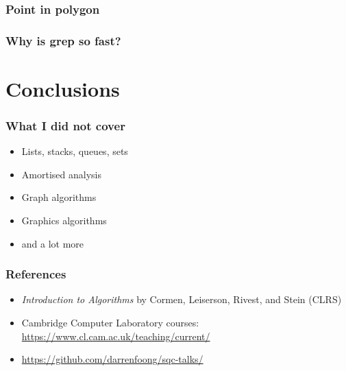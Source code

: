 \documentclass{beamer}
\begin{document}
\begin{frame}
 \frametitle{Point in polygon}
\end{frame}

\begin{frame}
 \frametitle{Why is grep so fast?}
\end{frame}

\section{Conclusions}

\begin{frame}
 \frametitle{What I did not cover}
 \begin{itemize}
  \item Lists, stacks, queues, sets
  \item Amortised analysis
  \item Graph algorithms
  \item Graphics algorithms
  \item and a lot more
 \end{itemize}
\end{frame}

\begin{frame}
 \frametitle{References}
 \begin{itemize}
  \item \emph{Introduction to Algorithms} by Cormen, Leiserson, Rivest, and Stein (CLRS)
  \item Cambridge Computer Laboratory courses: \url{https://www.cl.cam.ac.uk/teaching/current/}
  \item \url{https://github.com/darrenfoong/sqc-talks/}
 \end{itemize}
\end{frame}
\end{document}
